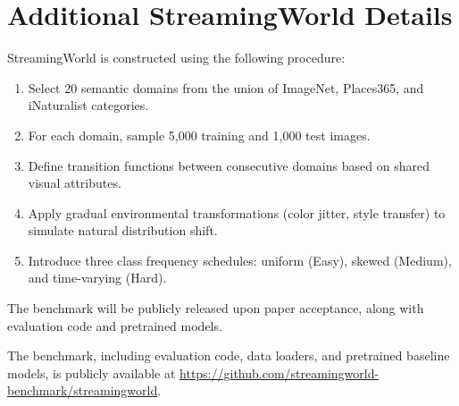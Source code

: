 \documentclass[11pt]{article}
\begin{document}
\section{Additional StreamingWorld Details}
\label{app:streaming}

StreamingWorld is constructed using the following procedure:
\begin{enumerate}
    \item Select 20 semantic domains from the union of ImageNet, Places365, and iNaturalist categories.
    \item For each domain, sample 5,000 training and 1,000 test images.
    \item Define transition functions between consecutive domains based on shared visual attributes.
    \item Apply gradual environmental transformations (color jitter, style transfer) to simulate natural distribution shift.
    \item Introduce three class frequency schedules: uniform (Easy), skewed (Medium), and time-varying (Hard).
\end{enumerate}

The benchmark will be publicly released upon paper acceptance, along with evaluation code and pretrained models.

The benchmark, including evaluation code, data loaders, and pretrained baseline models, is publicly available at \url{https://github.com/streamingworld-benchmark/streamingworld}.
\end{document}
